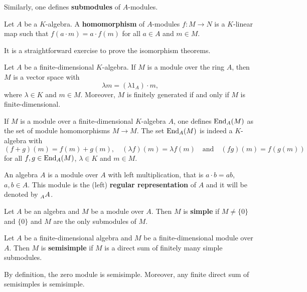 Similarly, one defines \textbf{submodules} of $A$-modules. 

\begin{definition}
Let $A$ be a $K$-algebra. 
A \textbf{homomorphism} of $A$-modules 
$f\colon M\to N$ is a $K$-linear map such that $f(a\cdot m)=a\cdot f(m)$ for all
$a\in A$ and $m\in M$.  
\end{definition}

It is a straightforward exercise to 
prove the isomorphism theorems. 

Let $A$ be a finite-dimensional $K$-algebra. 
If $M$ is a module over the ring $A$, then $M$ is a vector space with  
\[
\lambda m=(\lambda 1_A)\cdot m, 
\]
where $\lambda\in K$ and $m\in M$. 
Moreover, $M$ is finitely generated if and only if $M$ is finite-dimensional.  

\begin{example}
If $M$ is a module over a finite-dimensional $K$-algebra $A$, one defines $\operatorname{End}_A(M)$ as the set
of module homomorphisms $M\to M$. The set  
$\operatorname{End}_A(M)$ is indeed a $K$-algebra with 
\[
(f+g)(m)=f(m)+g(m),\quad 
(\lambda f)(m)=\lambda f(m)
\quad\text{and}
\quad 
(fg)(m)=f(g(m))
\]
for all $f,g\in\operatorname{End}_A(M)$, 
$\lambda\in K$ and $m\in M$. 
\end{example}


\begin{example}
An algebra  $A$ is a module over $A$ with left multiplication, that is $a\cdot b=ab$, $a,b\in A$.
This module is the (left) \textbf{regular representation} of $A$ and it will be denoted by $\prescript{}{A}{A}$. 
\end{example}

\begin{definition}
	Let $A$ be an algebra and $M$ be a module over $A$. Then 
	$M$ is \textbf{simple} if $M\ne\{0\}$ and $\{0\}$ and $M$ 
	are the only submodules of $M$.	
\end{definition}

\begin{definition}
	Let $A$ be a finite-dimensional 
	algebra and $M$ be a finite-dimensional module over $A$. Then 
	$M$ is \textbf{semisimple} if $M$ is a direct sum of 
	finitely many simple submodules.  
\end{definition}

By definition, the zero module is semisimple. Moreover, 
any finite direct sum of semisimples is semisimple. 

